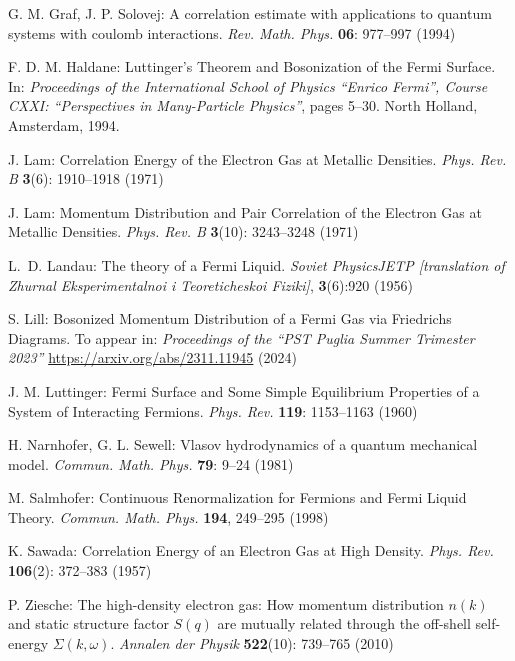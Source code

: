 \documentclass[12pt,a4paper]{article}
\numberwithin{equation}{section}
\newcommand{\1}{\mathbb{I}}
\theoremstyle{plain}
\theoremstyle{definition}
\theoremstyle{remark}
\theoremstyle{plain}
\theoremstyle{definition}
\theoremstyle{remark}
\begin{document}
\begin{thebibliography}{29}
G. M. Graf, J. P. Solovej:
	A correlation estimate with applications to quantum systems with coulomb interactions.
	\emph{Rev. Math. Phys.} \textbf{06}: 977--997 (1994)

F. D. M. Haldane:
	Luttinger's {{Theorem}} and {{Bosonization}} of the {{Fermi Surface}}.
	In: \emph{Proceedings of the {{International School}} of {{Physics}}
  ``{{Enrico Fermi}}'', {{Course CXXI}}: ``{{Perspectives}} in
  {{Many}}-{{Particle Physics}}''}, pages 5--30. {North Holland}, {Amsterdam},
  1994.

J. Lam:
	Correlation Energy of the Electron Gas at Metallic Densities.
	\emph{Phys. Rev. B} \textbf{3}(6): 1910--1918 (1971)

J. Lam:
	Momentum Distribution and Pair Correlation of the Electron Gas at Metallic Densities.
	\emph{Phys. Rev. B} \textbf{3}(10): 3243--3248 (1971)

L.~D. Landau:
	The theory of a Fermi Liquid.
	\emph{Soviet Physics\textendash JETP [translation of Zhurnal
  Eksperimentalnoi i Teoreticheskoi Fiziki]}, \textbf{3}(6):920 (1956)

S. Lill:
	Bosonized Momentum Distribution of a Fermi Gas via Friedrichs Diagrams.
	To appear in: \emph{Proceedings of the ``PST Puglia Summer Trimester 2023''} \url{https://arxiv.org/abs/2311.11945} (2024)

J. M. Luttinger:
	Fermi Surface and Some Simple Equilibrium Properties of a System of Interacting Fermions.
	\emph{Phys. Rev.} {\bf 119}: 1153--1163 (1960)

H. Narnhofer, G. L. Sewell:
	Vlasov hydrodynamics of a quantum mechanical model.
	\emph{Commun. Math. Phys.} {\bf 79}: 9--24 (1981)

M. Salmhofer:
	Continuous Renormalization for Fermions and Fermi Liquid Theory.
	\emph{Commun. Math. Phys.} \textbf{194}, 249--295 (1998)

K. Sawada:
	Correlation Energy of an Electron Gas at High Density.
	\emph{Phys. Rev.} \textbf{106}(2): 372--383 (1957)

P. Ziesche:
	The high-density electron gas: How momentum distribution $n(k)$ and static structure factor $S(q)$ are mutually related through the off-shell self-energy $\Sigma(k,\omega)$.
	\emph{Annalen der Physik} \textbf{522}(10): 739--765 (2010)

\end{thebibliography}
\end{document}
